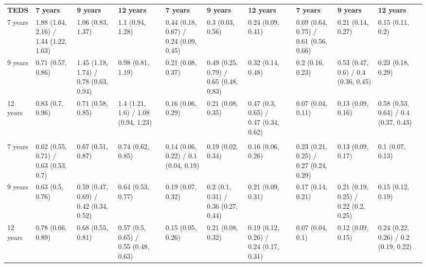 \begin{table}[htbp]
\begin{tabular}{llllrlllrlllr}
\cmidrule{2-4}\cmidrule{6-8}\cmidrule{10-12}    \textbf{TEDS} & \textbf{7 years} & \textbf{9 years} & \textbf{12 years} &       & \textbf{7 years} & \textbf{9 years} & \textbf{12 years} &       & \textbf{7 years} & \textbf{9 years} & \textbf{12 years} &  \\
\cmidrule{1-12}    7 years & 1.88 (1.64, 2.16) / 1.44 (1.22, 1.63) & 1.06 (0.83, 1.37) & 1.1 (0.94, 1.28) &       & 0.44 (0.18, 0.67) / 0.24 (0.09, 0.45) & 0.3 (0.03, 0.56) & 0.24 (0.09, 0.41) &       & 0.69 (0.64, 0.75) / 0.61 (0.56, 0.66) & 0.21 (0.14, 0.27) & 0.15 (0.11, 0.2) &  \\
    9 years & 0.71 (0.57, 0.86) & 1.45 (1.18, 1.74) / 0.78 (0.63, 0.94) & 0.98 (0.81, 1.19) &       & 0.21 (0.08, 0.37) & 0.49 (0.25, 0.79) / 0.65 (0.48, 0.83) & 0.32 (0.14, 0.48) &       & 0.2 (0.16, 0.23) & 0.53 (0.47, 0.6) / 0.4 (0.36, 0.45) & 0.23 (0.18, 0.29) &  \\
    12 years & 0.83 (0.7, 0.96) & 0.71 (0.58, 0.85) & 1.4 (1.21, 1.6) / 1.08 (0.94, 1.23) &       & 0.16 (0.06, 0.29) & 0.21 (0.08, 0.35) & 0.47 (0.3, 0.65) / 0.47 (0.34, 0.62) &       & 0.07 (0.04, 0.11) & 0.13 (0.09, 0.16) & 0.58 (0.53, 0.64) / 0.4 (0.37, 0.43) &  \\
          & \multicolumn{3}{c}{}  &       & \multicolumn{3}{c}{}  &       & \multicolumn{3}{c}{}  &  \\
    7 years & 0.62 (0.55, 0.71) / 0.63 (0.53, 0.7) & 0.67 (0.51, 0.87) & 0.74 (0.62, 0.85) &       & 0.14 (0.06, 0.22) / 0.1 (0.04, 0.19) & 0.19 (0.02, 0.34) & 0.16 (0.06, 0.26) &       & 0.23 (0.21, 0.25) / 0.27 (0.24, 0.29) & 0.13 (0.09, 0.17) & 0.1 (0.07, 0.13) &  \\
    9 years & 0.63 (0.5, 0.76) & 0.59 (0.47, 0.69) / 0.42 (0.34, 0.52) & 0.64 (0.53, 0.77) &       & 0.19 (0.07, 0.32) & 0.2 (0.1, 0.31) / 0.36 (0.27, 0.44) & 0.21 (0.09, 0.31) &       & 0.17 (0.14, 0.21) & 0.21 (0.19, 0.25) / 0.22 (0.2, 0.25) & 0.15 (0.12, 0.19) &  \\
    12 years & 0.78 (0.66, 0.89) & 0.68 (0.55, 0.81) & 0.57 (0.5, 0.65) / 0.55 (0.48, 0.63) &       & 0.15 (0.05, 0.26) & 0.21 (0.08, 0.32) & 0.19 (0.12, 0.26) / 0.24 (0.17, 0.31) &       & 0.07 (0.04, 0.1) & 0.12 (0.09, 0.15) & 0.24 (0.22, 0.26) / 0.2 (0.19, 0.22) &  \\
    \bottomrule
    \end{tabular}%
  \label{tab:addlabel}%
\end{table}%
